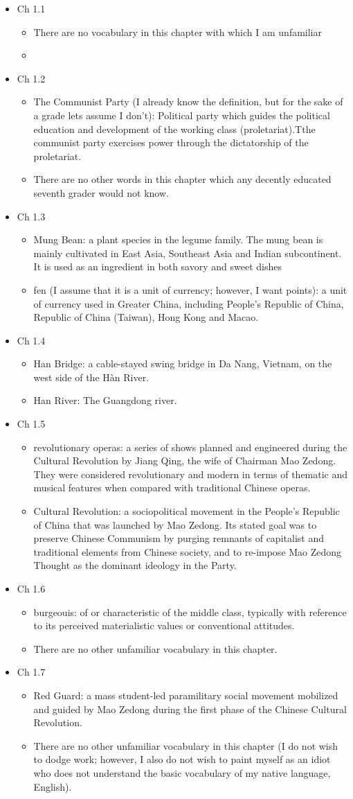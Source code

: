 \documentclass[12pt]{article}
\newcommand{\vc}[4]{
  \item Ch #1.#2
  \begin{itemize}
    \item #3
    \item #4
  \end{itemize}
}
\begin{document}
\begin{itemize}

  \vc{1}{1}{There are no vocabulary in this chapter with which I am unfamiliar}{}

  \vc{1}{2}{The Communist Party (I already know the definition, but for the sake of a grade lets assume I don't): Political party which guides the political education and development of the working class (proletariat).Tthe communist party exercises power through the dictatorship of the proletariat.}{There are no other words in this chapter which any decently educated seventh grader would not know.}

  \vc{1}{3}{Mung Bean: a plant species in the legume family. The mung bean is mainly cultivated in East Asia, Southeast Asia and Indian subcontinent. It is used as an ingredient in both savory and sweet dishes}{fen (I assume that it is a unit of currency; however, I want points): a unit of currency used in Greater China, including People's Republic of China, Republic of China (Taiwan), Hong Kong and Macao.}

  \vc{1}{4}{Han Bridge: a cable-stayed swing bridge in Da Nang, Vietnam, on the west side of the Hàn River.}{Han River: The Guangdong river.}

  \vc{1}{5}{revolutionary operas: a series of shows planned and engineered during the Cultural Revolution by Jiang Qing, the wife of Chairman Mao Zedong. They were considered revolutionary and modern in terms of thematic and musical features when compared with traditional Chinese operas.}{Cultural Revolution: a sociopolitical movement in the People's Republic of China that was launched by Mao Zedong. Its stated goal was to preserve Chinese Communism by purging remnants of capitalist and traditional elements from Chinese society, and to re-impose Mao Zedong Thought as the dominant ideology in the Party.}

  \vc{1}{6}{burgeouis: of or characteristic of the middle class, typically with reference to its perceived materialistic values or conventional attitudes.}{There are no other unfamiliar vocabulary in this chapter.}

  \vc{1}{7}{Red Guard: a mass student-led paramilitary social movement mobilized and guided by Mao Zedong during the first phase of the Chinese Cultural Revolution.}{There are no other unfamiliar vocabulary in this chapter (I do not wish to dodge work; however, I also do not wish to paint myself as an idiot who does not understand the basic vocabulary of my native language, English).}


\end{itemize}
\end{document}
